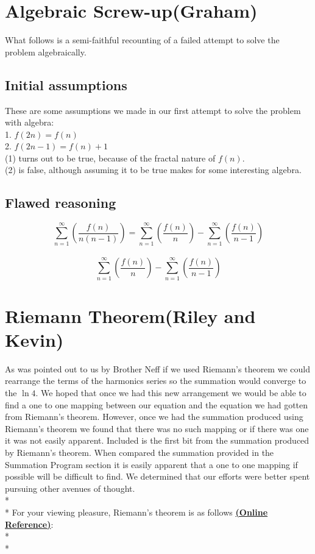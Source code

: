 \documentclass{article}
\begin{document}

\section{Algebraic Screw-up(Graham)}
What follows is a semi-faithful recounting of a failed attempt to solve the problem algebraically.
\subsection{Initial assumptions}
These are some assumptions we made in our first attempt to solve the problem with algebra:\\
1. $f(2n) = f(n)$\\
2. $f(2n-1) = f(n) + 1$\\

(1) turns out to be true, because of the fractal nature of $f(n)$.\\
(2) is false, although assuming it to be true makes for some interesting algebra.\\

\subsection{Flawed reasoning}
$$\sum_{n=1}^\infty \left( \frac{f(n)}{n(n-1)} \right)=\sum_{n=1}^\infty \left( \frac{f(n)}{n} \right)-\sum_{n=1}^\infty \left( \frac{f(n)}{n-1} \right)$$\\
$$\sum_{n=1}^\infty \left( \frac{f(n)}{n} \right)-\sum_{n=1}^\infty \left( \frac{f(n)}{n-1} \right)$$

\section{Riemann Theorem(Riley and Kevin)}
As was pointed out to us by Brother Neff if we used Riemann's theorem we could rearrange the terms of the harmonics series so the summation would converge to the $\ln 4$.  We hoped that once we had this new arrangement we would be able to find a one to one mapping between our equation and the equation we had gotten from Riemann's theorem. However, once we had the summation produced using Riemann's theorem we found that there was no such mapping or if there was one it was not easily apparent. Included is the first bit from the summation produced by Riemann's theorem. When compared the summation provided in the Summation Program section it is easily apparent that a one to one mapping if possible will be difficult to find. We determined that our efforts were better spent pursuing other avenues of thought.
\\*
\\* For your viewing pleasure, Riemann's theorem is as follows \href{http://planetmath.org/encyclopedia/ConditionallyConvergentSeriesOfRealNumbersCanBeRearrangedToConvergeToAnyNumber.html}{{\bf(Online Reference)}}:
\\*
\\*
\end{document}
